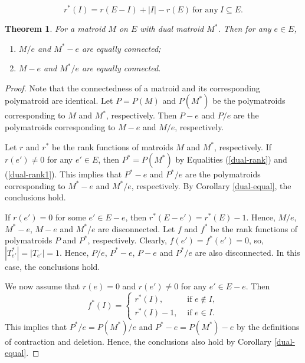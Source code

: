 \documentclass[10pt,a4paper]{amsart}
\newtheorem{theorem}{Theorem}
\begin{document}
\begin{equation}\label{dual-rank1}
r^*(I) = r(E-I) + |I| - r(E) ~\text{for any}~I\subseteq E.
\end{equation}

\begin{theorem}\label{dual-equal1}
For a matroid $M$ on $E$ with dual matroid $M^*$.  Then for any $e\in E$,
\begin{enumerate}
\item [(1)] $M/e$ and $M^*-e$ are equally connected;
\item [(2)] $M-e$ and $M^*/e$ are equally connected.
\end{enumerate}
\end{theorem}

\begin{proof}
Note that the connectedness of a matroid and its corresponding polymatroid are identical.
Let $P=P(M)$ and $P(M^*)$ be the polymatroids corresponding to $M$ and $M^*$, respectively. Then $P-e$ and $P/e$ are the polymatroids corresponding to $M-e$ and $M/e$, respectively.

Let $r$ and $r^*$ be the rank functions of matroids $M$ and $M^*$, respectively. If $r(e')\neq 0$ for any $e'\in E$, then $P^*=P(M^*)$ by Equalities (\ref{dual-rank}) and (\ref{dual-rank1}). This implies that $P^*-e$ and $P^*/e$ are the polymatroids corresponding to $M^*-e$ and $M^*/e$, respectively. By Corollary \ref{dual-equal}, the conclusions hold.

If $r(e')= 0$ for some $e'\in E-e$, then $r^*(E-e')=r^*(E)-1$. Hence, $M/e$, $M^*-e$,  $M-e$ and $M^*/e$ are disconnected. Let $f$ and $f^*$ be the rank functions of polymatroids $P$ and $P^*$, respectively. Clearly, $f(e')=f^*(e')=0$, so, $|T^*_{e'}|=|T_{e'}|=1$. Hence, $P/e$, $P^*-e$,  $P- e$ and $P^*/e$ are also disconnected. In this case, the conclusions hold.


We now assume that $r(e)= 0$ and $r(e')\neq 0$ for any $e'\in E-e$. Then 	
\begin{equation*}\label{Tutte-DC}
				f^*(I)=\left\{\begin{array}{ll}
					r^*(I),&\text{ if } e\notin I,\\
                    r^*(I)-1,&\text{ if } e\in I.
				\end{array}\right.
			\end{equation*}
This implies that $P^*/e=P(M^*)/e$ and $P^*- e=P(M^*)-e$ by the definitions of contraction and deletion. Hence, the conclusions also hold by Corollary \ref{dual-equal}.
\end{proof}
\end{document}
